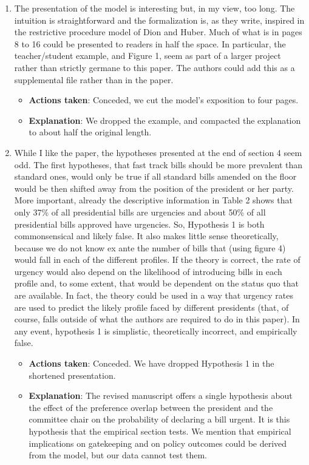 \documentclass[article,letterpaper,times,12pt,listings-bw,microtype]{article}
\begin{document}
\begin{enumerate}
\begin{itemize}
\end{itemize}
\item The presentation of the model is interesting but, in my view, too long. The intuition is straightforward and the formalization is, as they write, inspired in the restrictive procedure model of Dion and Huber. Much of what is in pages 8 to 16 could be presented to readers in half the space. In particular, the teacher/student example, and Figure 1, seem as part of a larger project rather than strictly germane to this paper. The authors could add this as a supplemental file rather than in the paper.
\label{sec:org5045633}
\begin{itemize}
\item \textbf{Actions taken}: Conceded, we cut the model's exposition to four pages.
\item \textbf{Explanation}: We dropped the example, and compacted the explanation to about half the original length.
\end{itemize}
\item While I like the paper, the hypotheses presented at the end of section 4 seem odd. The first hypotheses, that fast track bills should be more prevalent than standard ones, would only be true if all standard bills amended on the floor would be then shifted away from the position of the president or her party. More important, already the descriptive information in Table 2 shows that only 37\% of all presidential bills are urgencies and about 50\% of all presidential bills approved have urgencies. So, Hypothesis 1 is both commonsensical and likely false. It also makes little sense theoretically, because we do not know ex ante the number of bills that (using figure 4) would fall in each of the different profiles. If the theory is correct, the rate of urgency would also depend on the likelihood of introducing bills in each profile and, to some extent, that would be dependent on the status quo that are available. In fact, the theory could be used in a way that urgency rates are used to predict the likely profile faced by different presidents (that, of course, falls outside of what the authors are required to do in this paper). In any event, hypothesis 1 is simplistic, theoretically incorrect, and empirically false.
\label{sec:orgde19343}
\begin{itemize}
\item \textbf{Actions taken}: Conceded. We have dropped Hypothesis 1 in the shortened presentation.
\item \textbf{Explanation}: The revised manuscript offers a single hypothesis about the effect of the preference overlap between the president and the committee chair on the probability of declaring a bill urgent. It is this hypothesis that the empirical section tests. We mention that empirical implications on gatekeeping and on policy outcomes could be derived from the model, but our data cannot test them.

\end{itemize}
\end{enumerate}
\end{document}
